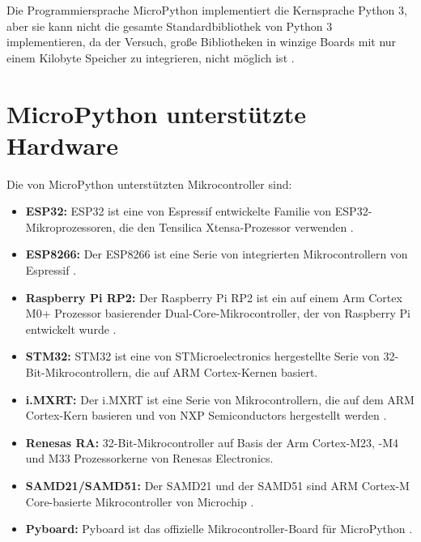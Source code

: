 Die Programmiersprache MicroPython implementiert die Kernsprache Python 3, aber sie kann nicht die gesamte Standardbibliothek von Python 3 implementieren, da der Versuch, gro\ss e Bibliotheken in winzige Boards mit nur einem Kilobyte Speicher zu integrieren, nicht möglich ist \cite{Maik:2021}. 





\section{MicroPython unterstützte Hardware}

Die von MicroPython unterstützten Mikrocontroller sind:
\begin{itemize}
	\item \textbf{ESP32:} ESP32 ist eine von Espressif entwickelte Familie von ESP32-Mikroprozessoren, die den Tensilica Xtensa-Prozessor verwenden \cite{micropython:2024esp32}. 
	\item \textbf{ESP8266:} Der ESP8266 ist eine Serie von integrierten Mikrocontrollern von Espressif \cite{micropython:2024esp8266}. 
	\item \textbf{Raspberry Pi RP2:} Der Raspberry Pi RP2 ist ein auf einem Arm Cortex M0+ Prozessor basierender Dual-Core-Mikrocontroller, der von Raspberry Pi entwickelt wurde \cite{micropython:2024rp2}. 
	\item \textbf{STM32:} STM32 ist eine von STMicroelectronics hergestellte Serie von 32-Bit-Mikrocontrollern, die auf ARM Cortex-Kernen basiert. 
	\item \textbf{i.MXRT:} Der i.MXRT ist eine Serie von Mikrocontrollern, die auf dem ARM Cortex-Kern basieren und von NXP Semiconductors hergestellt werden \cite{micropython:2024mimxrt}. 
	\item \textbf{Renesas RA:} 32-Bit-Mikrocontroller auf Basis der Arm Cortex-M23, -M4 und M33 Prozessorkerne von Renesas Electronics.
	\item \textbf{SAMD21/SAMD51:} Der SAMD21 und der SAMD51 sind ARM Cortex-M Core-basierte Mikrocontroller von Microchip \cite{micropython:2024samd}. 
	\item \textbf{Pyboard:} Pyboard ist das offizielle Mikrocontroller-Board für MicroPython \cite{micropython:2024pyboard}. 
\end{itemize}
